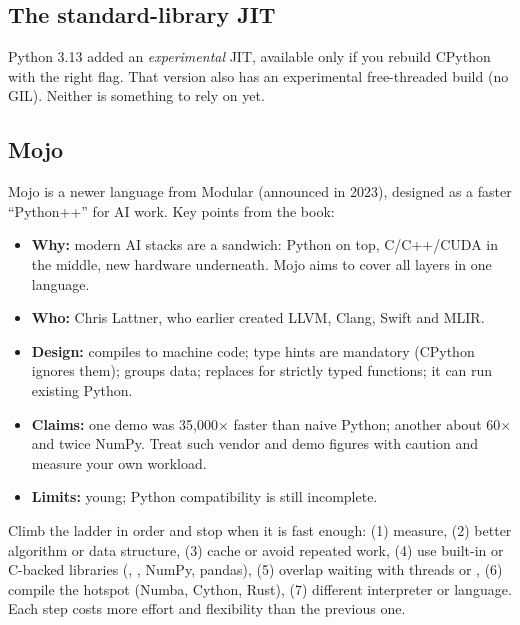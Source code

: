 \subsection{The standard-library JIT}

Python 3.13 added an \emph{experimental} JIT, available only if you rebuild CPython with the right
flag. That version also has an experimental free-threaded build (no GIL). Neither is something to
rely on yet.

\subsection{Mojo}

Mojo is a newer language from Modular (announced in 2023), designed as a faster ``Python++'' for AI
work. Key points from the book:

\begin{itemize}[leftmargin=*]
\item \textbf{Why:} modern AI stacks are a sandwich: Python on top, C/C++/CUDA in the middle, new
hardware underneath. Mojo aims to cover all layers in one language.
\item \textbf{Who:} Chris Lattner, who earlier created LLVM, Clang, Swift and MLIR.
\item \textbf{Design:} compiles to machine code; type hints are mandatory (CPython ignores them);
 groups data;  replaces  for strictly typed functions; it can run
existing Python.
\item \textbf{Claims:} one demo was 35{,}000$\times$ faster than naive Python; another about 60$\times$
and twice NumPy. Treat such vendor and demo figures with caution and measure your own workload.
\item \textbf{Limits:} young; Python compatibility is still incomplete.
\end{itemize}

\begin{gamerule}
Climb the ladder in order and stop when it is fast enough: (1) measure, (2) better algorithm or data
structure, (3) cache or avoid repeated work, (4) use built-in or C-backed libraries (,
, NumPy, pandas), (5) overlap waiting with threads or , (6) compile the
hotspot (Numba, Cython, Rust), (7) different interpreter or language. Each step costs more effort
and flexibility than the previous one.
\end{gamerule}

